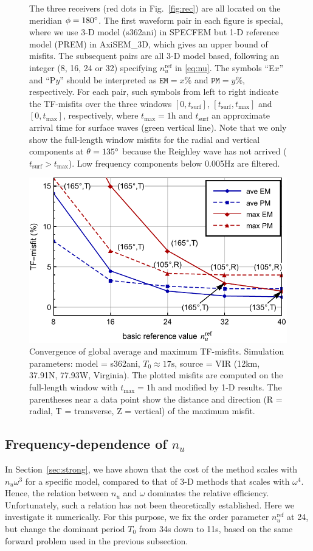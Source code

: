 \documentclass[extra]{gji}
\begin{document}
\begin{figure}
{  The three receivers (red dots in Fig.~\ref{fig:rec})
  are all located on the meridian $\phi=180\hbox{$^\circ$}$. 
  The first waveform pair in each figure is special, where we use 3-D model (s362ani)
  in SPECFEM but 1-D reference model (PREM) in AxiSEM\_3D, which gives
  an upper bound of misfits. The subsequent pairs are all 3-D model based, 
  following an integer (8, 16, 24 or 32) specifying $n_u^\text{ref}$ in \eqref{eq:nu}. 
  The symbols ``E$x$'' and ``P$y$'' should be interpreted as 
  $\mathtt{EM}=x\%$ and $\mathtt{PM}=y\%$, respectively.
  For each pair, such symbols from left to right indicate the TF-misfits 
  over the three windows $[0,t_\text{surf}]$, $[t_\text{surf},t_\text{max}]$ 
  and $[0,t_\text{max}]$, respectively,
  where $t_\text{max}=1\text{h}$ and
  $t_\text{surf}$ an approximate arrival time for surface waves 
  (green vertical line). Note that we only show the 
  full-length window misfits for the radial and vertical components
  at $\theta=135\hbox{$^\circ$}$ because the Reighley wave has not arrived 
  ($t_\text{surf}>t_\text{max}$).
  Low frequency components below 0.005Hz are filtered.}
  \label{fig:empml}
\end{figure}

\begin{figure}
  \centering
  \includegraphics[width=.46\textwidth]{fig/conv_empm/nu_misfit.pdf}
  \caption{Convergence of global average and maximum TF-misfits. 
  Simulation parameters: model = s362ani, $T_0\approx17\text{s}$, 
  source = VIR (12km, 37.91\degr N, 77.93\degr W, Virginia).
  The plotted misfits are computed on the full-length window with 
  $t_\text{max}=1\text{h}$ and modified by 1-D results.
  The parentheses near a data point show the distance and 
  direction (R = radial, T = transverse, Z = vertical) 
  of the maximum misfit.} 
  \label{fig:empm}
\end{figure}

\subsection{Frequency-dependence of $n_u$}
\label{sec:benfreq}
In Section~\ref{sec:strong}, we have shown that the cost of the method
scales with $n_u\omega^3$ for a specific model, compared to that of 3-D 
methods that scales with $\omega^4$.
Hence, the relation between $n_u$ and $\omega$ dominates the 
relative efficiency. 
Unfortunately, such a relation has not been theoretically established. 
Here we investigate it numerically. 
For this purpose, we fix the order parameter $n_u^\text{ref}$ at 24, but 
change the dominant period $T_0$ from 34s down to 11s, based on the same 
forward problem used in the previous subsection. 
\end{document}
